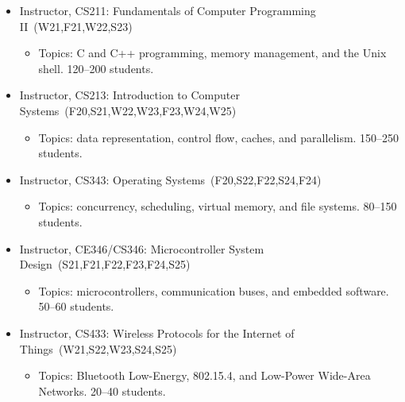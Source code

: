 \documentclass{article}
\begin{document}
\begin{itemize}
  \item[] Instructor, CS211: Fundamentals of Computer Programming II~(W21,F21,W22,S23)
    \vspace{-\topsep}
    \vspace{\itemsep}
    \begin{itemize}
      \item Topics: C and C++ programming, memory management, and the Unix shell. 120--200 students.
    \end{itemize}
  \item[] Instructor, CS213: Introduction to Computer Systems~(F20,S21,W22,W23,F23,W24,W25)
    \vspace{-\topsep}
    \vspace{\itemsep}
    \begin{itemize}
      \item Topics: data representation, control flow, caches, and parallelism. 150--250 students.
    \end{itemize}
  \item[] Instructor, CS343: Operating Systems~(F20,S22,F22,S24,F24)
    \vspace{-\topsep}
    \vspace{\itemsep}
    \begin{itemize}
      \item Topics: concurrency, scheduling, virtual memory, and file systems. 80--150 students.
    \end{itemize}
  \item[] Instructor, CE346/CS346: Microcontroller System Design~(S21,F21,F22,F23,F24,S25)
    \vspace{-\topsep}
    \vspace{\itemsep}
    \begin{itemize}
      \item Topics: microcontrollers, communication buses, and embedded software. 50--60 students.
    \end{itemize}
  \item[] Instructor, CS433: Wireless Protocols for the Internet of Things~(W21,S22,W23,S24,S25)
    \vspace{-\topsep}
    \vspace{\itemsep}
    \begin{itemize}
      \item Topics: Bluetooth Low-Energy, 802.15.4, and Low-Power Wide-Area Networks. 20--40 students.
    \end{itemize}
\end{itemize}
\end{document}
